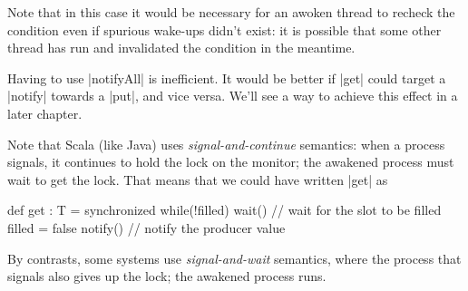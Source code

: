 
\begin{slide}

Note that in this case it would be necessary for an awoken thread to recheck
the condition even if spurious wake-ups didn't exist: it is possible that some
other thread has run and invalidated the condition in the meantime.

Having to use |notifyAll| is inefficient.  It would be better if |get| could
target a |notify| towards a |put|, and vice versa.  We'll see a way to achieve
this effect in a later chapter.
\end{slide}


\begin{slide}

Note that Scala (like Java) uses \emph{signal-and-continue} semantics: when a
process signals, it continues to hold the lock on the monitor; the
awakened process must wait to get the lock.  That means that we could have
written |get| as 
%
\begin{scala}
  def get : T = synchronized{
    while(!filled) wait() // wait for the slot to be filled
    filled = false
    notify() // notify the producer
    value
  }
\end{scala}

By contrasts, some systems use \emph{signal-and-wait} semantics, where the
process that signals also gives up the lock; the awakened process runs.
\end{slide}









